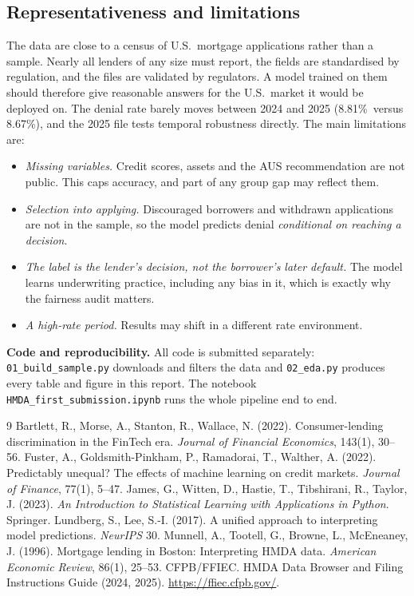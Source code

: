 \documentclass[11pt,a4paper]{article}
\newcommand{\pct}{\%}
\begin{document}
\subsection{Representativeness and limitations}
The data are close to a census of U.S.\ mortgage applications rather than a sample.
Nearly all lenders of any size must report, the fields are standardised by
regulation, and the files are validated by regulators. A model trained on them should
therefore give reasonable answers for the U.S.\ market it would be deployed on.
The denial rate barely moves between 2024 and 2025 (8.81\pct\ versus 8.67\pct), and
the 2025 file tests temporal robustness directly. The main limitations are:
\begin{itemize}
  \item \emph{Missing variables.} Credit scores, assets and the AUS recommendation
  are not public. This caps accuracy, and part of any group gap may reflect them.
  \item \emph{Selection into applying.} Discouraged borrowers and withdrawn
  applications are not in the sample, so the model predicts denial \emph{conditional
  on reaching a decision}.
  \item \emph{The label is the lender's decision, not the borrower's later default.}
  The model learns underwriting practice, including any bias in it, which is exactly
  why the fairness audit matters.
  \item \emph{A high-rate period.} Results may shift in a different rate environment.
\end{itemize}

\vspace{2pt}
\textbf{Code and reproducibility.} All code is submitted separately:
\texttt{01\_build\_sample.py} downloads and filters the data and
\texttt{02\_eda.py} produces every table and figure in this report. The notebook
\texttt{HMDA\_first\_submission.ipynb} runs the whole pipeline end to end.

\vspace{-4pt}
\begin{thebibliography}{9}\footnotesize
\setlength{\itemsep}{-1pt}
 Bartlett, R., Morse, A., Stanton, R., Wallace, N. (2022).
Consumer-lending discrimination in the FinTech era. \emph{Journal of Financial
Economics}, 143(1), 30--56.
 Fuster, A., Goldsmith-Pinkham, P., Ramadorai, T., Walther, A.
(2022). Predictably unequal? The effects of machine learning on credit markets.
\emph{Journal of Finance}, 77(1), 5--47.
 James, G., Witten, D., Hastie, T., Tibshirani, R., Taylor, J. (2023).
\emph{An Introduction to Statistical Learning with Applications in Python}. Springer.
 Lundberg, S., Lee, S.-I. (2017). A unified approach to
interpreting model predictions. \emph{NeurIPS} 30.
 Munnell, A., Tootell, G., Browne, L., McEneaney, J. (1996).
Mortgage lending in Boston: Interpreting HMDA data. \emph{American Economic Review},
86(1), 25--53.
 CFPB/FFIEC. HMDA Data Browser and Filing Instructions Guide (2024, 2025).
\url{https://ffiec.cfpb.gov/}.
\end{thebibliography}
\end{document}
